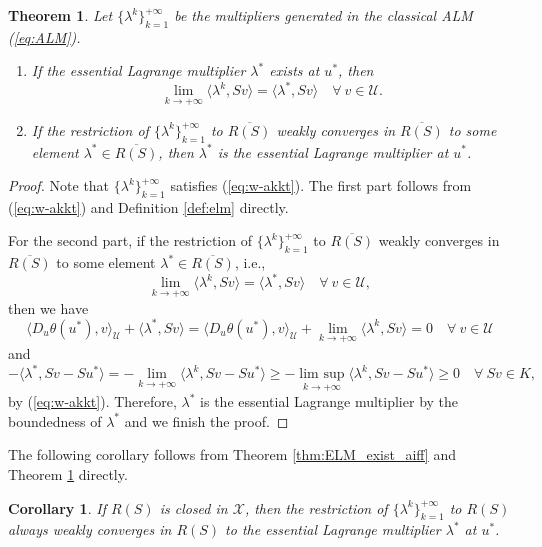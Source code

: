 \documentclass[leqno]{amsart}
\DeclareMathOperator*\uplim{lim\ sup}
\newtheorem{theorem}{Theorem}[section]
\newtheorem{Corollary}[Theorem]{Corollary}
\theoremstyle{definition}
\begin{document}
\begin{theorem}\label{thm:ALM-ELM}
Let $\{\lambda^k\}_{k=1}^{+\infty}$ be the multipliers generated in the classical ALM (\ref{eq:ALM}). 
\begin{enumerate}[(1)]
\item If the essential Lagrange multiplier $\lambda^*$ exists at $u^*$, then 
\begin{equation}\label{eq:m-c}
\lim\limits_{k\rightarrow + \infty} \langle \lambda^k, Sv\rangle = \langle \lambda^*, Sv\rangle\quad \forall\ v\in \mathcal{U}.
\end{equation}

\item If the restriction of $\{\lambda^k\}_{k=1}^{+\infty}$ to $\overline{R(S)}$ weakly converges in $\overline{R(S)}$ to some element $\lambda^*\in \overline{R(S)}$, then $\lambda^*$ is the essential Lagrange multiplier at $u^*$.
\end{enumerate}

\end{theorem}

\begin{proof}
Note that  $\{\lambda^k\}_{k=1}^{+\infty}$ satisfies (\ref{eq:w-akkt}).  The first part follows from (\ref{eq:w-akkt}) and Definition \ref{def:elm} directly.

For the second part, if the restriction of $\{\lambda^k\}_{k=1}^{+\infty}$ to $\overline{R(S)}$ weakly converges in $\overline{R(S)}$ to some element $\lambda^*\in \overline{R(S)}$, i.e., 
$$\lim\limits_{k\rightarrow +\infty}\langle \lambda^k, Sv\rangle =  \langle \lambda^*, Sv\rangle\quad \forall\ v\in \mathcal{U},$$
then we have
$$ \langle D_u\theta(u^*), v\rangle_\mathcal{U} +   \langle \lambda^*, Sv\rangle = \langle D_u\theta(u^*), v\rangle_\mathcal{U}  + \lim\limits_{k\rightarrow +\infty}\langle \lambda^{k}, Sv\rangle = 0\quad \forall\ v\in \mathcal{U}$$
and
$$ -\langle \lambda^*, Sv - Su^*\rangle = -\lim\limits_{k\rightarrow +\infty} \langle \lambda^k, Sv - Su^*\rangle\geq -\uplim\limits_{k\rightarrow +\infty} \langle \lambda^k, Sv - Su^*\rangle\geq 0\quad \forall\ Sv\in K,$$
by (\ref{eq:w-akkt}). Therefore, $\lambda^*$ is the essential Lagrange multiplier by the boundedness of $\lambda^*$ and we finish the proof.

\end{proof}

The following corollary follows from Theorem \ref{thm:ELM_exist_aiff} and Theorem \ref{thm:ALM-ELM} directly.
\begin{Corollary}
If $R(S)$ is closed in $\mathcal{X}$, then the restriction of $\{\lambda^k\}_{k=1}^{+\infty}$ to $R(S)$ always weakly converges in $R(S)$ to the essential Lagrange multiplier $\lambda^*$ at $u^*$.
\end{Corollary}
\end{document}
